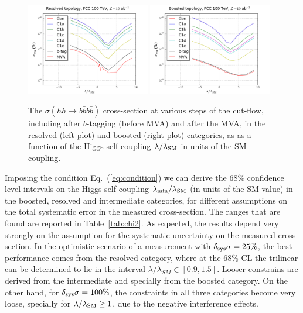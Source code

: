 \documentclass[a4paper,10pt]{article}
\newcommand{\lc}{\left[}
\newcommand{\rc}{\right]}
\begin{document}
\begin{figure}[t]
\begin{center}
\includegraphics[width=0.48\textwidth]{plots/res_xSec_100TeV.pdf}
\includegraphics[width=0.48\textwidth]{plots/bst_xSec_100TeV.pdf}
\caption{\small
  The $\sigma(hh\to b\bar{b}b\bar{b})$ cross-section at
  various steps of the cut-flow, including after $b$-tagging
  (before MVA) and after the MVA, in the resolved (left plot)
  and boosted (right plot) categories, as  as a function of the Higgs self-coupling
  $\lambda/\lambda_{\rm SM}$ in units of the SM coupling.
}
\label{fig:chi2}
\end{center}
\end{figure}

  Imposing the condition Eq.~(\ref{eq:condition}) we can derive the 68\% confidence level intervals
  on the Higgs self-coupling $\lambda_{\rm min}/\lambda_{\rm SM}$ (in units of the SM value) in the boosted, resolved and intermediate categories, for  different assumptions on the total systematic error in the measured
  cross-section.
  The ranges that are found are reported in Table~\ref{tab:chi2}.
  As expected, the results depend very strongly on the assumption for the systematic uncertainty
  on the measured cross-section.
  In the optimistic scenario of a measurement with $\delta_{\rm sys}\sigma=25\%$,
  the best performance comes from the resolved category, where at the 68\% CL the trilinear
  can be determined to lie in the interval $\lambda/\lambda_{SM}\in \lc 0.9, 1.5\rc$.
  Looser constrains are derived from the intermediate and specially from the boosted category.
  On the other hand, for $\delta_{\rm sys}\sigma=100\%$, the constraints in all three categories
  become very loose, specially for $\lambda/\lambda_{\rm SM}\ge 1$, due to the negative interference effects.
\end{document}
